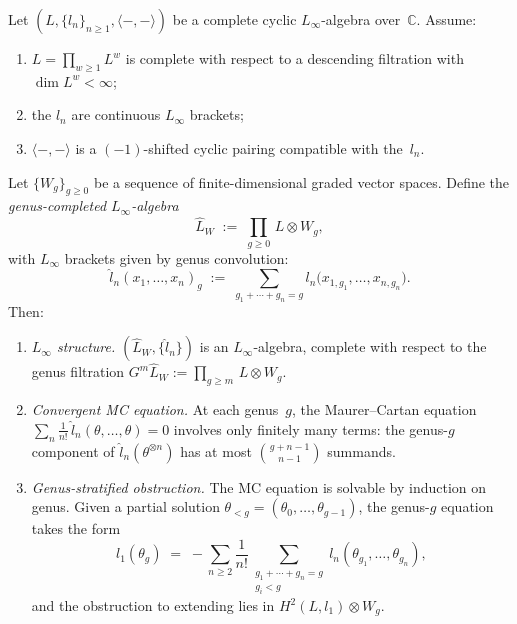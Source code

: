 \begin{proposition}\label{prop:genus-completed-mc-framework}
Let $(L, \{l_n\}_{n \geq 1}, \langle{-},{-}\rangle)$ be a complete
cyclic $L_\infty$-algebra over~$\mathbb{C}$.
Assume:
\begin{enumerate}[label=\textup{(\roman*)}]
\item $L = \prod_{w \geq 1} L^w$ is complete with respect to a
  descending filtration with $\dim L^w < \infty$;
\item the $l_n$ are continuous $L_\infty$ brackets;
\item $\langle{-},{-}\rangle$ is a $(-1)$-shifted cyclic pairing
  compatible with the~$l_n$.
\end{enumerate}
Let $\{W_g\}_{g \geq 0}$ be a sequence of finite-dimensional graded
vector spaces.  Define the \emph{genus-completed $L_\infty$-algebra}
\begin{equation}\label{eq:genus-completed-linf}
\widehat{L}_W \;:=\; \prod_{g \geq 0}\, L \otimes W_g,
\end{equation}
with $L_\infty$ brackets given by genus convolution:
\begin{equation}\label{eq:genus-convolution-brackets}
\hat{l}_n(x_1, \ldots, x_n)_g
\;:=\;
\sum_{g_1 + \cdots + g_n = g}
l_n\bigl(x_{1,g_1}, \ldots, x_{n,g_n}\bigr).
\end{equation}
Then:
\begin{enumerate}[label=\textup{(\alph*)}]
\item \emph{$L_\infty$ structure.}
  $(\widehat{L}_W, \{\hat{l}_n\})$ is an $L_\infty$-algebra, complete
  with respect to the genus filtration
  $G^m \widehat{L}_W := \prod_{g \geq m}\, L \otimes W_g$.
\item \emph{Convergent MC equation.}
  At each genus~$g$, the Maurer--Cartan equation
  $\sum_n \frac{1}{n!}\, \hat{l}_n(\theta, \ldots, \theta) = 0$
  involves only finitely many terms: the genus-$g$ component of
  $\hat{l}_n(\theta^{\otimes n})$ has at most
  $\binom{g+n-1}{n-1}$ summands.
\item \emph{Genus-stratified obstruction.}
  The MC equation is solvable by induction on genus.
  Given a partial solution $\theta_{<g} = (\theta_0, \ldots, \theta_{g-1})$,
  the genus-$g$ equation takes the form
  \begin{equation}\label{eq:genus-g-mc-linfty}
  l_1(\theta_g)
  \;=\;
  -\!\!\sum_{n \geq 2} \frac{1}{n!}
  \sum_{\substack{g_1 + \cdots + g_n = g \\ g_i < g}}
  l_n(\theta_{g_1}, \ldots, \theta_{g_n}),
  \end{equation}
  and the obstruction to extending lies in
  $H^2(L, l_1) \otimes W_g$.
\end{enumerate}
\end{proposition}

